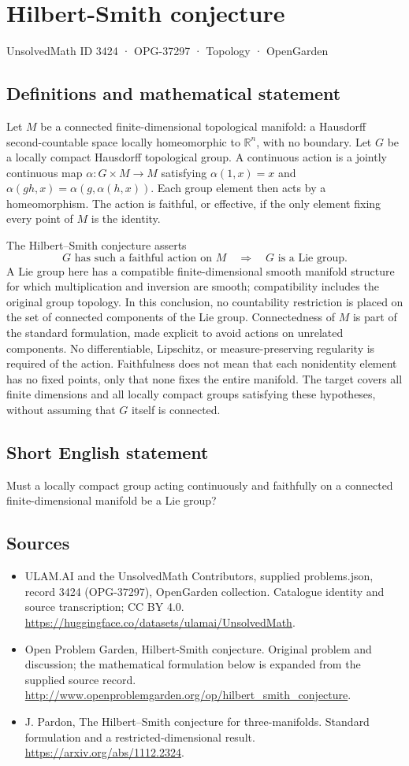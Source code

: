 \documentclass[11pt,a4paper]{article}
\begin{document}
\section*{Hilbert-Smith conjecture}\label{3424}
{\small UnsolvedMath ID 3424 · OPG-37297 · Topology · OpenGarden}
\subsection{Definitions and mathematical statement}
Let $M$ be a connected finite-dimensional topological manifold:
a Hausdorff second-countable space locally homeomorphic to
$\mathbb R^n$, with no boundary. Let $G$ be a locally compact
Hausdorff topological group. A continuous action is a jointly
continuous map $\alpha:G\times M\to M$ satisfying
$\alpha(1,x)=x$ and $\alpha(gh,x)=\alpha(g,\alpha(h,x))$.
Each group element then acts by a homeomorphism. The action is
faithful, or effective, if the only element fixing every point of
$M$ is the identity.

The Hilbert--Smith conjecture asserts
\[
 G\text{ has such a faithful action on }M
             \quad\Longrightarrow\quad G\text{ is a Lie group}.
\]
A Lie group here has a compatible finite-dimensional smooth
manifold structure for which multiplication and inversion are smooth;
compatibility includes the original group topology. In this conclusion,
no countability restriction is placed on the set of connected components
of the Lie group.
Connectedness of $M$ is part of the standard formulation, made
explicit to avoid actions on unrelated components. No differentiable,
Lipschitz, or measure-preserving regularity is required of the action.
Faithfulness does not mean that each nonidentity element has no
fixed points, only that none fixes the entire manifold. The target
covers all finite dimensions and all locally compact groups satisfying
these hypotheses, without assuming that $G$ itself is connected.
\subsection{Short English statement}
Must a locally compact group acting continuously and faithfully on a connected finite-dimensional manifold be a Lie group?
\subsection{Sources}
\begin{itemize}
\item[S1] ULAM.AI and the UnsolvedMath Contributors, supplied problems.json, record 3424 (OPG-37297), OpenGarden collection. Catalogue identity and source transcription; CC BY 4.0.
\url{https://huggingface.co/datasets/ulamai/UnsolvedMath}.
\item[S2] Open Problem Garden, Hilbert-Smith conjecture. Original problem and discussion; the mathematical formulation below is expanded from the supplied source record.
\url{http://www.openproblemgarden.org/op/hilbert_smith_conjecture}.
\item[S3] J. Pardon, The Hilbert--Smith conjecture for three-manifolds. Standard formulation and a restricted-dimensional result.
\url{https://arxiv.org/abs/1112.2324}.
\end{itemize}
\end{document}
